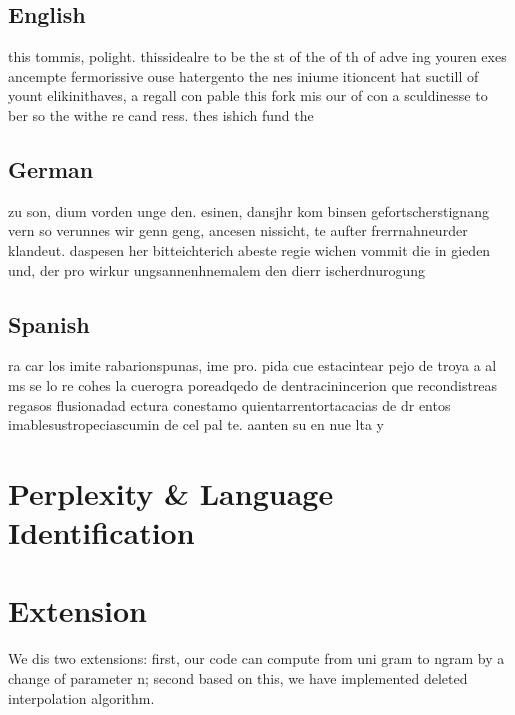 \documentclass{article}
\begin{document}
\subsection{English}
this tommis, polight.
thissidealre to be the st of the of th of adve ing youren exes ancempte fermorissive ouse hatergento the nes iniume itioncent hat suctill of yount elikinithaves, a regall con pable this fork mis our of con a sculdinesse to ber so the withe re cand ress.
thes ishich fund the

\subsection{German}
zu son, dium vorden unge den.
esinen, dansjhr kom binsen gefortscherstignang vern so verunnes wir genn geng, ancesen nissicht, te aufter frerrnahneurder klandeut.
daspesen her bitteichterich abeste regie wichen vommit die in gieden und, der pro wirkur ungsannenhnemalem den dierr ischerdnurogung 

\subsection{Spanish}
ra car los imite rabarionspunas, ime pro.
pida cue estacintear pejo de troya a al ms se lo re cohes la cuerogra poreadqedo de dentracinincerion que recondistreas regasos flusionadad ectura conestamo quientarrentortacacias de dr entos imablesustropeciascumin de cel pal te.
aanten su en nue lta y 

\section{Perplexity \& Language Identification}



\section{Extension}
We dis two extensions: first, our code can compute from uni gram to ngram by a change of parameter n; second based on this, we have implemented deleted interpolation algorithm.




\end{document}

